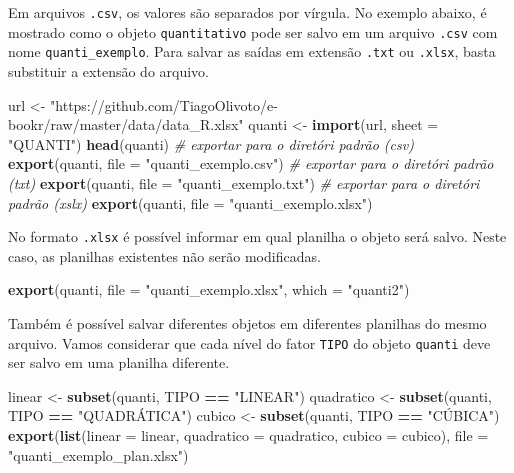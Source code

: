 \documentclass[
]{book}
\newenvironment{Shaded}{\begin{snugshade}}{\end{snugshade}}
\newcommand{\CommentTok}[1]{\textcolor[rgb]{0.56,0.35,0.01}{\textit{#1}}}
\newcommand{\DataTypeTok}[1]{\textcolor[rgb]{0.13,0.29,0.53}{#1}}
\newcommand{\KeywordTok}[1]{\textcolor[rgb]{0.13,0.29,0.53}{\textbf{#1}}}
\newcommand{\NormalTok}[1]{#1}
\newcommand{\OperatorTok}[1]{\textcolor[rgb]{0.81,0.36,0.00}{\textbf{#1}}}
\newcommand{\StringTok}[1]{\textcolor[rgb]{0.31,0.60,0.02}{#1}}
\begin{document}
Em arquivos \texttt{.csv}, os valores são separados por vírgula. No exemplo abaixo, é mostrado como o objeto \texttt{quantitativo} pode ser salvo em um arquivo \texttt{.csv} com nome \texttt{quanti\_exemplo}. Para salvar as saídas em extensão \texttt{.txt} ou \texttt{.xlsx}, basta substituir a extensão do arquivo.

\begin{Shaded}
\begin{Highlighting}[]
\NormalTok{url <-}\StringTok{ "https://github.com/TiagoOlivoto/e-bookr/raw/master/data/data_R.xlsx"}
\NormalTok{quanti <-}\StringTok{ }\KeywordTok{import}\NormalTok{(url, }\DataTypeTok{sheet =} \StringTok{"QUANTI"}\NormalTok{)}
\KeywordTok{head}\NormalTok{(quanti)}
\CommentTok{# exportar para o diretóri padrão (csv)}
\KeywordTok{export}\NormalTok{(quanti, }\DataTypeTok{file =} \StringTok{"quanti_exemplo.csv"}\NormalTok{)}
\CommentTok{# exportar para o diretóri padrão (txt)}
\KeywordTok{export}\NormalTok{(quanti, }\DataTypeTok{file =} \StringTok{"quanti_exemplo.txt"}\NormalTok{)}
\CommentTok{# exportar para o diretóri padrão (xslx)}
\KeywordTok{export}\NormalTok{(quanti, }\DataTypeTok{file =} \StringTok{"quanti_exemplo.xlsx"}\NormalTok{)}
\end{Highlighting}
\end{Shaded}

No formato \texttt{.xlsx} é possível informar em qual planilha o objeto será salvo. Neste caso, as planilhas existentes não serão modificadas.

\begin{Shaded}
\begin{Highlighting}[]
\KeywordTok{export}\NormalTok{(quanti, }\DataTypeTok{file =} \StringTok{"quanti_exemplo.xlsx"}\NormalTok{, }\DataTypeTok{which =} \StringTok{"quanti2"}\NormalTok{)}
\end{Highlighting}
\end{Shaded}

Também é possível salvar diferentes objetos em diferentes planilhas do mesmo arquivo. Vamos considerar que cada nível do fator \texttt{TIPO} do objeto \texttt{quanti} deve ser salvo em uma planilha diferente.

\begin{Shaded}
\begin{Highlighting}[]
\NormalTok{linear <-}\StringTok{ }\KeywordTok{subset}\NormalTok{(quanti, TIPO }\OperatorTok{==}\StringTok{ "LINEAR"}\NormalTok{)}
\NormalTok{quadratico <-}\StringTok{ }\KeywordTok{subset}\NormalTok{(quanti, TIPO }\OperatorTok{==}\StringTok{ "QUADRÁTICA"}\NormalTok{)}
\NormalTok{cubico <-}\StringTok{ }\KeywordTok{subset}\NormalTok{(quanti, TIPO }\OperatorTok{==}\StringTok{ "CÚBICA"}\NormalTok{)}
\KeywordTok{export}\NormalTok{(}\KeywordTok{list}\NormalTok{(}\DataTypeTok{linear =}\NormalTok{ linear,}
            \DataTypeTok{quadratico =}\NormalTok{ quadratico, }
            \DataTypeTok{cubico =}\NormalTok{ cubico),}
       \DataTypeTok{file =} \StringTok{"quanti_exemplo_plan.xlsx"}\NormalTok{)}
\end{Highlighting}
\end{Shaded}
\end{document}

